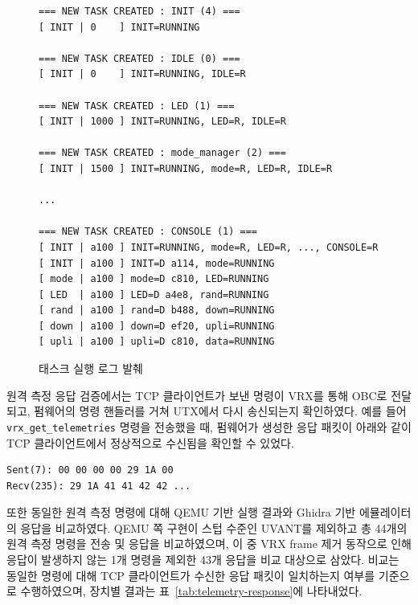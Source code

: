 \documentclass[master,korean,final]{kaist-ucs}
\begin{document}
\begin{figure}[t]
\begin{center}
\begin{minipage}{0.92\linewidth}
\begin{small}
\begin{verbatim}
=== NEW TASK CREATED : INIT (4) ===
[ INIT | 0    ] INIT=RUNNING

=== NEW TASK CREATED : IDLE (0) ===
[ INIT | 0    ] INIT=RUNNING, IDLE=R

=== NEW TASK CREATED : LED (1) ===
[ INIT | 1000 ] INIT=RUNNING, LED=R, IDLE=R

=== NEW TASK CREATED : mode_manager (2) ===
[ INIT | 1500 ] INIT=RUNNING, mode=R, LED=R, IDLE=R

...

=== NEW TASK CREATED : CONSOLE (1) ===
[ INIT | a100 ] INIT=RUNNING, mode=R, LED=R, ..., CONSOLE=R
[ INIT | a100 ] INIT=D a114, mode=RUNNING
[ mode | a100 ] mode=D c810, LED=RUNNING
[ LED  | a100 ] LED=D a4e8, rand=RUNNING
[ rand | a100 ] rand=D b488, down=RUNNING
[ down | a100 ] down=D ef20, upli=RUNNING
[ upli | a100 ] upli=D c810, data=RUNNING
\end{verbatim}
\end{small}
\end{minipage}
\end{center}
\caption{태스크 실행 로그 발췌}
\label{fig:task-execution-log}
\end{figure}

원격 측정 응답 검증에서는 TCP 클라이언트가 보낸 명령이 VRX를 통해 OBC로 전달되고, 펌웨어의 명령 핸들러를 거쳐 UTX에서 다시 송신되는지 확인하였다. 예를 들어 \texttt{vrx\_get\_telemetries} 명령을 전송했을 때, 펌웨어가 생성한 응답 패킷이 아래와 같이 TCP 클라이언트에서 정상적으로 수신됨을 확인할 수 있었다.

\begin{verbatim}
Sent(7): 00 00 00 00 29 1A 00
Recv(235): 29 1A 41 41 42 42 ...
\end{verbatim}

또한 동일한 원격 측정 명령에 대해 QEMU 기반 실행 결과와 Ghidra 기반 에뮬레이터의 응답을 비교하였다. QEMU 쪽 구현이 스텁 수준인 UVANT를 제외하고 총 44개의 원격 측정 명령을 전송 및 응답을 비교하였으며, 이 중 VRX frame 제거 동작으로 인해 응답이 발생하지 않는 1개 명령을 제외한 43개 응답을 비교 대상으로 삼았다. 비교는 동일한 명령에 대해 TCP 클라이언트가 수신한 응답 패킷이 일치하는지 여부를 기준으로 수행하였으며, 장치별 결과는 표~\ref{tab:telemetry-response}에 나타내었다.
\end{document}

